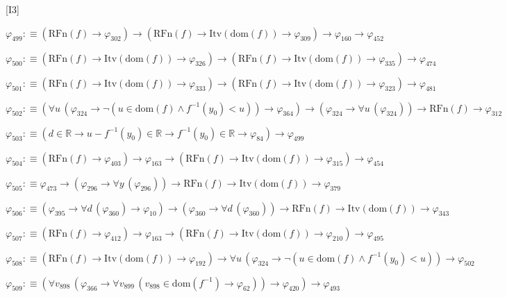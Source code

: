 \begin{fullproof}{[I3]}
\begin{abbrevlist}
\item $\varphi_{499} :\equiv (\mathrm{RFn}(f) \to \varphi_{302}) \to (\mathrm{RFn}(f) \to \mathrm{Itv}(\mathrm{dom}(f)) \to \varphi_{309}) \to \varphi_{160} \to \varphi_{452}$
\item $\varphi_{500} :\equiv (\mathrm{RFn}(f) \to \mathrm{Itv}(\mathrm{dom}(f)) \to \varphi_{326}) \to (\mathrm{RFn}(f) \to \mathrm{Itv}(\mathrm{dom}(f)) \to \varphi_{335}) \to \varphi_{474}$
\item $\varphi_{501} :\equiv (\mathrm{RFn}(f) \to \mathrm{Itv}(\mathrm{dom}(f)) \to \varphi_{333}) \to (\mathrm{RFn}(f) \to \mathrm{Itv}(\mathrm{dom}(f)) \to \varphi_{323}) \to \varphi_{481}$
\item $\varphi_{502} :\equiv (\forall u\,(\varphi_{324} \to \neg (u \in \mathrm{dom}(f) \land f^{-1}(y_{0}) < u)) \to \varphi_{364}) \to (\varphi_{324} \to \forall u\,(\varphi_{324})) \to \mathrm{RFn}(f) \to \varphi_{312}$
\item $\varphi_{503} :\equiv (d \in \mathbb{R} \to u - f^{-1}(y_{0}) \in \mathbb{R} \to f^{-1}(y_{0}) \in \mathbb{R} \to \varphi_{84}) \to \varphi_{499}$
\item $\varphi_{504} :\equiv (\mathrm{RFn}(f) \to \varphi_{403}) \to \varphi_{163} \to (\mathrm{RFn}(f) \to \mathrm{Itv}(\mathrm{dom}(f)) \to \varphi_{315}) \to \varphi_{454}$
\item $\varphi_{505} :\equiv \varphi_{473} \to (\varphi_{296} \to \forall y\,(\varphi_{296})) \to \mathrm{RFn}(f) \to \mathrm{Itv}(\mathrm{dom}(f)) \to \varphi_{379}$
\item $\varphi_{506} :\equiv (\varphi_{395} \to \forall d\,(\varphi_{360}) \to \varphi_{10}) \to (\varphi_{360} \to \forall d\,(\varphi_{360})) \to \mathrm{RFn}(f) \to \mathrm{Itv}(\mathrm{dom}(f)) \to \varphi_{343}$
\item $\varphi_{507} :\equiv (\mathrm{RFn}(f) \to \varphi_{412}) \to \varphi_{163} \to (\mathrm{RFn}(f) \to \mathrm{Itv}(\mathrm{dom}(f)) \to \varphi_{210}) \to \varphi_{495}$
\item $\varphi_{508} :\equiv (\mathrm{RFn}(f) \to \mathrm{Itv}(\mathrm{dom}(f)) \to \varphi_{192}) \to \forall u\,(\varphi_{324} \to \neg (u \in \mathrm{dom}(f) \land f^{-1}(y_{0}) < u)) \to \varphi_{502}$
\item $\varphi_{509} :\equiv (\forall v_{898}\,(\varphi_{366} \to \forall v_{899}\,(v_{898} \in \mathrm{dom}(f^{-1}) \to \varphi_{62})) \to \varphi_{420}) \to \varphi_{493}$
\end{abbrevlist}
\end{fullproof}
